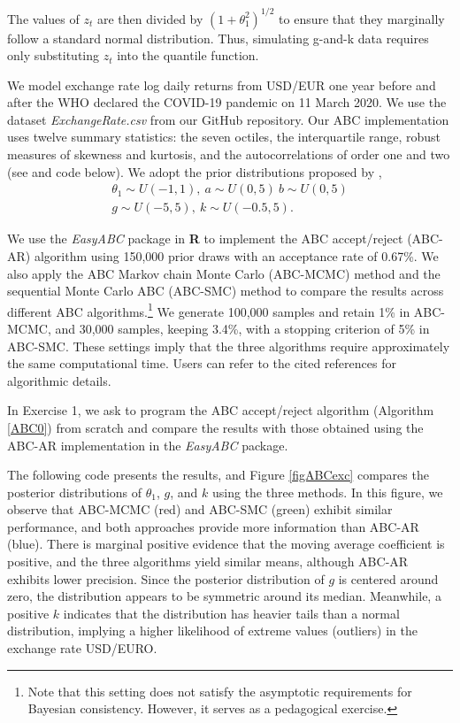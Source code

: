The values of \(z_t\) are then divided by \((1+\theta_1^2)^{1/2}\) to ensure that they marginally follow a standard normal distribution. Thus, simulating g-and-k data requires only substituting \(z_t\) into the quantile function.  

We model exchange rate log daily returns from USD/EUR one year before and after the WHO declared the COVID-19 pandemic on 11 March 2020. We use the dataset \textit{ExchangeRate.csv} from our GitHub repository. Our ABC implementation uses twelve summary statistics: the seven octiles, the interquartile range, robust measures of skewness and kurtosis, and the autocorrelations of order one and two (see \cite{drovandi2011likelihood} and code below). We adopt the prior distributions proposed by \cite{ramirez2024testing}, 
\begin{align*}
	\theta_1\sim U(-1,1), \ a\sim U(0,5) \ b\sim U(0,5)\\
	g\sim U(-5,5), \ k\sim U(-0.5, 5).
\end{align*}

We use the \textit{EasyABC} package in \textbf{R} to implement the ABC accept/reject (ABC-AR) algorithm using 150,000 prior draws with an acceptance rate of 0.67\%. We also apply the ABC Markov chain Monte Carlo (ABC-MCMC) method \cite{marjoram2003markov} and the sequential Monte Carlo ABC (ABC-SMC) method \cite{lenormand2013adaptive} to compare the results across different ABC algorithms.\footnote{Note that this setting does not satisfy the asymptotic requirements for Bayesian consistency. However, it serves as a pedagogical exercise.} We generate 100,000 samples and retain 1\% in ABC-MCMC, and 30,000 samples, keeping 3.4\%, with a stopping criterion of 5\% in ABC-SMC. These settings imply that the three algorithms require approximately the same computational time. Users can refer to the cited references for algorithmic details.

In Exercise 1, we ask to program the ABC accept/reject algorithm (Algorithm \ref{ABC0}) from scratch and compare the results with those obtained using the ABC-AR implementation in the \textit{EasyABC} package.

The following code presents the results, and Figure \ref{figABCexc} compares the posterior distributions of $\theta_1$, $g$, and $k$ using the three methods. In this figure, we observe that ABC-MCMC (red) and ABC-SMC (green) exhibit similar performance, and both approaches provide more information than ABC-AR (blue). There is marginal positive evidence that the moving average coefficient is positive, and the three algorithms yield similar means, although ABC-AR exhibits lower precision. Since the posterior distribution of $g$ is centered around zero, the distribution appears to be symmetric around its median. Meanwhile, a positive $k$ indicates that the distribution has heavier tails than a normal distribution, implying a higher likelihood of extreme values (outliers) in the exchange rate USD/EURO.

